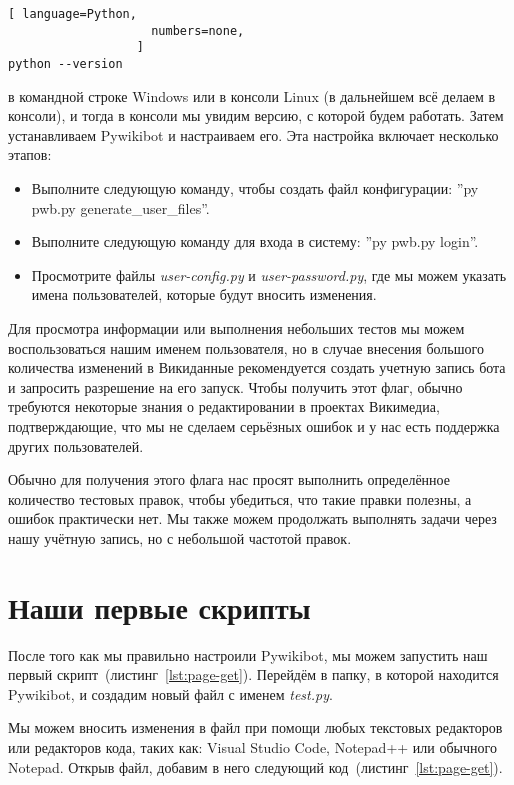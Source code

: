 \begin{lstlisting}[ language=Python,
                    numbers=none,
                  ]
python --version
\end{lstlisting}
в командной строке Windows или в консоли Linux (в дальнейшем всё делаем в консоли), и тогда в консоли мы увидим версию, с которой будем работать. Затем устанавливаем Pywikibot и настраиваем его. Эта настройка включает несколько этапов:

\begin{itemize}
  \setlength{\itemindent}{2em}
  \item Выполните следующую команду, чтобы создать файл конфигурации: ''py pwb.py generate\_user\_files''.
  \item Выполните следующую команду для входа в систему: ''py pwb.py login''.
  \item Просмотрите файлы \textit{user-config.py} и \textit{user-password.py}, где мы можем указать имена пользователей, которые будут вносить изменения.
\end{itemize}

Для просмотра информации или выполнения небольших тестов мы можем воспользоваться нашим именем пользователя, но в случае внесения большого количества изменений в Викиданные рекомендуется создать учетную запись бота и запросить разрешение на его запуск. Чтобы получить этот флаг, обычно требуются некоторые знания о редактировании в проектах Викимедиа, подтверждающие, что мы не сделаем серьёзных ошибок и у нас есть поддержка других пользователей.

Обычно для получения этого флага нас просят выполнить определённое количество тестовых правок, чтобы убедиться, что такие правки полезны, а ошибок практически нет. Мы также можем продолжать выполнять задачи через нашу учётную запись, но с небольшой частотой правок.

\section{Наши первые скрипты}
\label{sec:firstScript}
После того как мы правильно настроили Pywikibot, мы можем запустить 
наш первый скрипт~(листинг~\ref{lst:page-get}). 
Перейдём в папку, в которой находится Pywikibot, и создадим новый файл с именем \textit{test.py}.

Мы можем вносить изменения в файл при помощи любых текстовых редакторов 
или редакторов кода, таких как: 
Visual Studio Code, Notepad++ или обычного Notepad. 
Открыв файл, добавим в него следующий код~(листинг~\ref{lst:page-get}).

